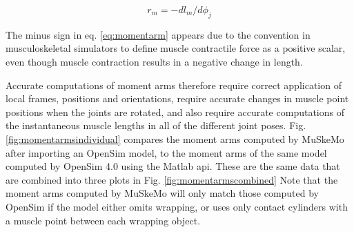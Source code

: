 \documentclass{article}
\begin{document}
\begin{equation}
r_m = -dl_m / d\phi_j
\end{equation}
\label{eq:momentarm}

The minus sign in eq. \ref{eq:momentarm} appears due to the convention in musculoskeletal simulators to define muscle contractile force as a positive scalar, even though muscle contraction results in a negative change in length.

Accurate computations of moment arms therefore require correct application of local frames, positions and orientations, require accurate changes in muscle point positions when the joints are rotated, and also require accurate computations of the instantaneous muscle lengths in all of the different joint poses. Fig. \ref{fig:momentarmsindividual} compares the moment arms computed by MuSkeMo after importing an OpenSim model, to the moment arms of the same model computed by OpenSim 4.0 using the Matlab api. These are the same data that are combined into three plots in Fig. \ref{fig:momentarmscombined} Note that the moment arms computed by MuSkeMo will only match those computed by OpenSim if the model either omits wrapping, or uses only contact cylinders with a muscle point between each wrapping object.
\end{document}
